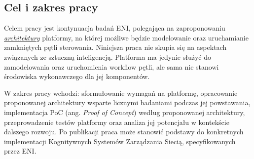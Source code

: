 \subsection{Cel i zakres pracy}

Celem pracy jest kontynuacja badań ENI, polegająca na zaproponowaniu \hyperref[def:architektura]{\textit{architektury}} platformy, na której możliwe będzie modelowanie oraz uruchamianie zamkniętych pętli sterowania. Niniejsza praca nie skupia się na aspektach związanych ze sztuczną inteligencją. Platforma ma jedynie służyć do zamodelowania oraz uruchomienia workflow pętli, ale sama nie stanowi środowiska wykonawczego dla jej komponentów. 

W zakres pracy wchodzi: sformułowanie wymagań na platformę, opracowanie proponowanej architektury wsparte licznymi badaniami podczas jej powstawania, implementacja PoC (ang. \textit{Proof of Concept}) według proponowanej architektury, przeprowadzenie testów platformy oraz analiza jej potencjału w kontekście dalszego rozwoju. Po publikacji praca może stanowić podstawy do konkretnych implementacji Kognitywnych Systemów Zarządzania Siecią, specyfikowanych przez ENI. 